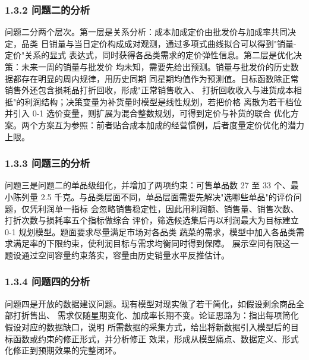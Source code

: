 \subsubsection{1.3.2 问题二的分析}

问题二分两个层次。第一层是关系分析：成本加成定价由批发价与加成率共同决定，品类
日销量与当日定价构成成对观测，通过多项式曲线拟合可以得到"销量-定价"关系的显式
表达式，同时获得各品类需求的定价弹性信息。第二层是优化决策：未来一周的销量与批发价
均未知，需要先给出预测。销量与批发价的历史数据都存在明显的周内规律，用历史同期
同星期均值作为预测值。目标函数除正常销售外还包含损耗品打折回收，形成"正常销售收入、
打折回收收入与进货成本相抵"的利润结构；决策变量为补货量时模型是线性规划，若把价格
离散为若干档位并引入 0-1 选价变量，则扩展为混合整数规划，可得到定价与补货的联合
优化方案。两个方案互为参照：前者贴合成本加成的经营惯例，后者度量定价优化的潜力上限。

\subsubsection{1.3.3 问题三的分析}

问题三是问题二的单品级细化，并增加了两项约束：可售单品数 27 至 33 个、最小陈列量
2.5 千克。与品类层面不同，单品层面需要先解决"选哪些单品"的评价问题，仅凭利润单一指标
会忽略销售稳定性，因此用利润额、销售量、销售次数、打折次数与损耗率五个指标做综合
评价，筛选候选集后再以利润最大为目标建立 0-1 规划模型。题面要求尽量满足市场对各品类
蔬菜的需求，模型中加入各品类需求满足率的下限约束，使利润目标与需求均衡同时得到保障。
展示空间有限这一题设通过空间容量约束落实，容量由历史销量水平反推估计。

\subsubsection{1.3.4 问题四的分析}

问题四是开放的数据建议问题。现有模型对现实做了若干简化，如假设剩余商品全部打折售出、
需求仅随星期变化、加成率长期不变。论证思路为：指出每项简化假设对应的数据缺口，说明
所需数据的采集方式，给出将新数据引入模型后的目标函数或约束的修正形式，并分析修正
效果，形成从模型痛点、数据定义、形式化修正到预期效果的完整闭环。
